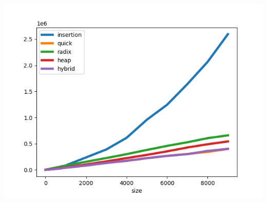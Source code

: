 \documentclass{article}
\begin{document}
\includegraphics[width=0.8\linewidth,height=0.4\textheight]{../data/full.png}
\end{document}
